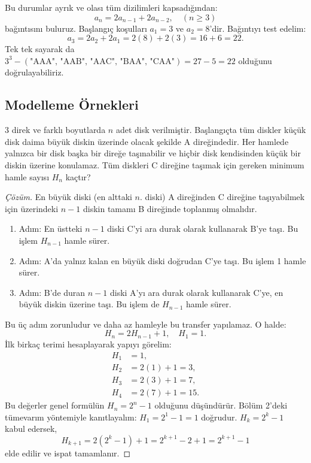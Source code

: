 Bu durumlar ayrık ve olası tüm dizilimleri kapsadığından:
\[
a_n = 2a_{n-1} + 2a_{n-2}, \quad (n \ge 3)
\]
bağıntısını buluruz. Başlangıç koşulları $a_1 = 3$ ve $a_2 = 8$'dir. Bağıntıyı test edelim:
\[
a_3 = 2a_2 + 2a_1 = 2(8) + 2(3) = 16 + 6 = 22.
\]
Tek tek sayarak da $3^3 - (\text{"AAA", "AAB", "AAC", "BAA", "CAA"}) = 27 - 5 = 22$ olduğunu doğrulayabiliriz.

\subsection{Modelleme Örnekleri}

\begin{example}
3 direk ve farklı boyutlarda $n$ adet disk verilmiştir. Başlangıçta tüm diskler küçük disk daima büyük diskin üzerinde olacak şekilde A direğindedir. Her hamlede yalnızca bir disk başka bir direğe taşınabilir ve hiçbir disk kendisinden küçük bir diskin üzerine konulamaz. Tüm diskleri C direğine taşımak için gereken minimum hamle sayısı $H_n$ kaçtır?
\end{example}

\begin{proof}[Çözüm]
En büyük diski (en alttaki $n$. diski) A direğinden C direğine taşıyabilmek için üzerindeki $n-1$ diskin tamamı B direğinde toplanmış olmalıdır. 

\begin{enumerate}
    \item Adım: En üstteki $n-1$ diski C'yi ara durak olarak kullanarak B'ye taşı. Bu işlem $H_{n-1}$ hamle sürer.
    \item Adım: A'da yalnız kalan en büyük diski doğrudan C'ye taşı. Bu işlem 1 hamle sürer.
    \item Adım: B'de duran $n-1$ diski A'yı ara durak olarak kullanarak C'ye, en büyük diskin üzerine taşı. Bu işlem de $H_{n-1}$ hamle sürer.
\end{enumerate}

Bu üç adım zorunludur ve daha az hamleyle bu transfer yapılamaz. O halde:
\[
H_n = 2H_{n-1} + 1, \quad H_1 = 1.
\]
İlk birkaç terimi hesaplayarak yapıyı görelim:
\begin{align*}
H_1 &= 1, \\
H_2 &= 2(1) + 1 = 3, \\
H_3 &= 2(3) + 1 = 7, \\
H_4 &= 2(7) + 1 = 15.
\end{align*}
Bu değerler genel formülün $H_n = 2^n - 1$ olduğunu düşündürür. Bölüm 2'deki tümevarım yöntemiyle kanıtlayalım:
$H_1 = 2^1 - 1 = 1$ doğrudur. $H_{k} = 2^k - 1$ kabul edersek,
\[
H_{k+1} = 2(2^k - 1) + 1 = 2^{k+1} - 2 + 1 = 2^{k+1} - 1
\]
elde edilir ve ispat tamamlanır.
\end{proof}

